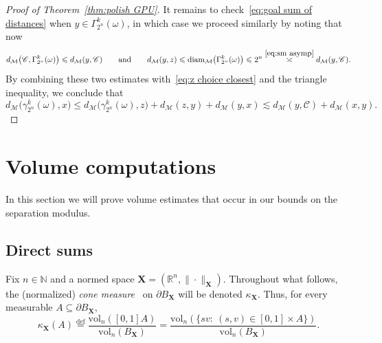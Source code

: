 \documentclass[11pt,reqno]{amsart}
\renewcommand{\le}{\leqslant}
\newcommand{\diam}{\mathrm{diam}}
\newcommand{\X}{\mathbf X}
\newcommand{\R}{\mathbb R}
\theoremstyle{remark}
\newcommand{\MM}{\mathcal{M}}
\renewcommand{\subset}{\subseteq}
\newcommand{\N}{\mathbb N}
\newcommand{\eqdef}{\stackrel{\mathrm{def}}{=}}
\newcommand{\sub}{\mathscr{C}}
\newcommand{\vol}{\mathrm{vol}}
\renewcommand{\1}{\mathbf 1}
\begin{document}
\begin{proof}[Proof of Theorem~\ref{thm:polish GPU}]
It remains to check~\eqref{eq:goal sum of distances} when $y\in \Gamma_{2^n}^k(\omega)$, in which case we proceed similarly by noting that now $$
d_{\MM}\big(\sub,\Gamma_{2^n}^k(\omega)\big)\le d_{\MM}(y,\sub)\qquad
\mathrm{and}\qquad  d_{\MM}(y,z)\le \diam_{\MM}\big(\Gamma_{2^n}^k(\omega)\big)\le 2^n\stackrel{\eqref{eq:sm asymp}}{\asymp}  d_\MM(y,\sub).
$$ By combining these two estimates with~\eqref{eq:z choice closest} and the triangle inequality, we conclude that
\begin{equation*}
d_{\MM}\big(\gamma_{2^n}^k(\omega),x\big)\le d_{\MM}\big(\gamma_{2^n}^k(\omega),z\big)+d_{\MM}(z,y)+d_{\MM}(y,x)\lesssim d_{\MM}(y,\sub)+d_{\MM}(x,y).\tag*{\qedhere}
\end{equation*}
\end{proof}




\section{Volume computations}\label{sec:volumes and cone measure}

In this section we will prove volume estimates that occur in our bounds on the separation modulus.


\subsection{Direct sums}\label{sec:direct} Fix $n\in \N$ and a normed space $\X=(\R^n,\|\cdot\|_{\X})$. Throughout what follows, the (normalized) {\em cone measure}~\cite{GM87} on $\partial B_{\X}$ will be denoted  $\kappa_{\X}$. Thus, for every measurable $A\subset \partial B_{\X}$,
\begin{equation}\label{eq:def cone measure}
\kappa_{\X}(A)\eqdef \frac{\vol_n([0,1]A)}{\vol_n(B_{\X})}=\frac{\vol_n(\{sv:\ (s,v)\in [0,1]\times A\})}{\vol_n(B_{\X})}.
\end{equation}
\end{document}
